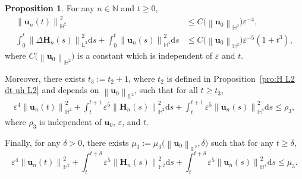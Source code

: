 \documentclass[11pt, reqno]{amsart}
\theoremstyle{definition}
\newtheorem{proposition}[theorem]{Proposition}
\numberwithin{equation}{section}
\newcommand{\bff}{\boldsymbol}
\newcommand{\bb}{\mathbb}
\newcommand{\ds}{\mathrm{d}s}
\newcommand{\bl}[1]{{\color{blue}{#1}}}
\newcommand{\norm}[2]{\left\|{#1}\right\|_{#2}}
\begin{document}
\begin{proposition}\label{pro:Delta un L2}
	For any $n\in \bb{N}$ and $t\geq 0$,
	\begin{align}
        \label{equ:H2 unif un}
        \norm{\bff{u}_n(t)}{\bb{H}^2}^2
        &\leq
        C\big(\norm{\bff{u}_0}{\bb{H}^2}\big) \varepsilon^{-4},%
        \\
        \label{equ:Delta un Hn L2}
		\int_0^t \norm{\Delta \bff{H}_n(s)}{\bb{L}^2}^2 \ds
		+
		\int_0^t \norm{\bff{u}_n(s)}{\bb{H}^4}^2 \ds
		&\leq 
		C\big(\norm{\bff{u}_0}{\bb{H}^2}\big) \varepsilon^{-5}  \left(1+t^3\right),
	\end{align}
	where $C\big(\norm{\bff{u}_0}{\bb{H}^2}\big)$ is a constant which is independent of $\varepsilon$ and $t$.
	
	Moreover, there exists $t_3:=t_2+1$, where $t_2$ is defined in Proposition~\ref{pro:H L2 dt uh L2} and depends on $\norm{\bff{u}_0}{\bb{L}^2}$, such that for all $t\geq t_3$,
	\begin{align}\label{equ:rho 2 sigma 2}
		\varepsilon^4 \norm{\bff{u}_n(t)}{\bb{H}^2}^2
		+
		\int_t^{t+1} \varepsilon^5 \norm{\bff{H}_n(s)}{\bb{H}^2}^2 \ds
		+
		\int_t^{t+1} \varepsilon^5 \norm{\bff{u}_n(s)}{\bb{H}^4}^2 \ds \leq \rho_3,
	\end{align}
	 where $\rho_3$ is independent of $\bff{u}_0$, $\varepsilon$, and $t$.
	
	Finally, for any $\delta>0$, there exists $\mu_3:= \mu_3\big(\norm{\bff{u}_0}{\bb{L}^2}, \delta\big)$ such that for any $t\geq \delta$,
	\begin{equation}\label{equ:Hn H2 mu}
	\varepsilon^4 \norm{\bff{u}_n(t)}{\bb{H}^2}^2
	+
	\int_t^{t+\delta} \varepsilon^5 \norm{\bff{H}_n(s)}{\bb{H}^2}^2 \ds
	+
	\int_t^{t+\delta} \varepsilon^5 \norm{\bff{u}_n(s)}{\bb{H}^4}^2 \ds
		\leq \mu_3.
	\end{equation}
\end{proposition}
\end{document}
